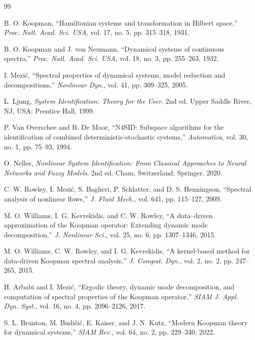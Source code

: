 \documentclass[journal]{IEEEtran}
\begin{document}
\begin{thebibliography}{99}

B. O. Koopman, ``Hamiltonian systems and transformation in Hilbert space,'' \emph{Proc. Natl. Acad. Sci. USA}, vol. 17, no. 5, pp. 315--318, 1931.

B. O. Koopman and J. von Neumann, ``Dynamical systems of continuous spectra,'' \emph{Proc. Natl. Acad. Sci. USA}, vol. 18, no. 3, pp. 255--263, 1932.

I. Mezi\'c, ``Spectral properties of dynamical systems, model reduction and decompositions,'' \emph{Nonlinear Dyn.}, vol. 41, pp. 309--325, 2005.

L. Ljung, \emph{System Identification: Theory for the User}, 2nd ed. Upper Saddle River, NJ, USA: Prentice Hall, 1999.

P. Van Overschee and B. De Moor, ``N4SID: Subspace algorithms for the identification of combined deterministic-stochastic systems,'' \emph{Automatica}, vol. 30, no. 1, pp. 75--93, 1994.

O. Nelles, \emph{Nonlinear System Identification: From Classical Approaches to Neural Networks and Fuzzy Models}, 2nd ed. Cham, Switzerland: Springer, 2020.

C. W. Rowley, I. Mezi\'c, S. Bagheri, P. Schlatter, and D. S. Henningson, ``Spectral analysis of nonlinear flows,'' \emph{J. Fluid Mech.}, vol. 641, pp. 115--127, 2009.

M. O. Williams, I. G. Kevrekidis, and C. W. Rowley, ``A data--driven approximation of the Koopman operator: Extending dynamic mode decomposition,'' \emph{J. Nonlinear Sci.}, vol. 25, no. 6, pp. 1307--1346, 2015.

M. O. Williams, C. W. Rowley, and I. G. Kevrekidis, ``A kernel-based method for data-driven Koopman spectral analysis,'' \emph{J. Comput. Dyn.}, vol. 2, no. 2, pp. 247--265, 2015.

H. Arbabi and I. Mezi\'c, ``Ergodic theory, dynamic mode decomposition, and computation of spectral properties of the Koopman operator,'' \emph{SIAM J. Appl. Dyn. Syst.}, vol. 16, no. 4, pp. 2096--2126, 2017.

S. L. Brunton, M. Budi\v{s}i\'c, E. Kaiser, and J. N. Kutz, ``Modern Koopman theory for dynamical systems,'' \emph{SIAM Rev.}, vol. 64, no. 2, pp. 229--340, 2022.


\end{thebibliography}
\end{document}
